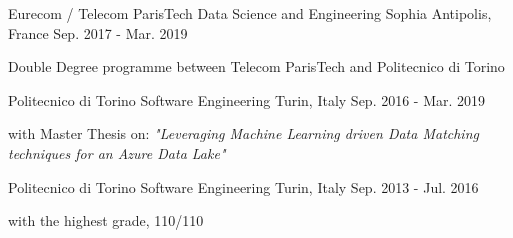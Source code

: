 

\begin{cventries}

  \cventry
    {Eurecom / Telecom ParisTech} %
    { Data Science and Engineering} %
    {Sophia Antipolis, France} %
    {Sep. 2017 - Mar. 2019} %
    {
      \begin{cvitems} %
        \item {Double Degree programme between Telecom ParisTech and Politecnico di Torino}
      \end{cvitems}
    }
  
  \cventry
    {Politecnico di Torino}
    { Software Engineering}
    {Turin, Italy}
    {Sep. 2016 - Mar. 2019}
    {
      \begin{cvitems} %
    	\item {with Master Thesis on: \textit{"Leveraging Machine Learning driven Data Matching techniques for an Azure Data Lake"}}
      \end{cvitems}
	}
  
  \cventry
    {Politecnico di Torino}
    { Software Engineering}
    {Turin, Italy}
    {Sep. 2013 - Jul. 2016}
    {
      \begin{cvitems}
        \item {with the highest grade, 110/110}
      \end{cvitems}
    }

\end{cventries}
